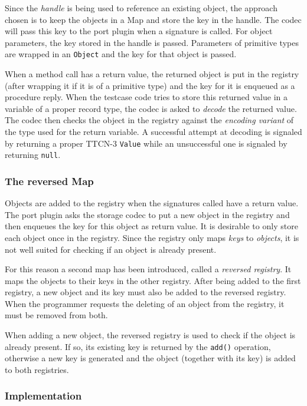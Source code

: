 Since the \emph{handle} is being used to reference an existing object,
the approach chosen is to keep the objects in a Map
and store the key in the handle.
The codec will pass this key to the port plugin when a signature is called.
For object parameters, the key stored in the handle is passed.
Parameters of primitive types are wrapped in an \verb=Object=
and the key for that object is passed.

When a method call has a return value,
the returned object is put in the registry
(after wrapping it if it is of a primitive type)
and the key for it is enqueued as a procedure reply.
When the testcase code tries to store this returned value
in a variable of a proper record type,
the codec is asked to \emph{decode} the returned value.
The codec then checks the object in the registry
against the \emph{encoding variant} of the type used for the return variable.
A successful attempt at decoding is signaled by returning
a proper \ac{TTCN-3} \verb=Value=
while an unsuccessful one is signaled by returning \verb=null=.


\subsubsection{The reversed Map}

Objects are added to the registry
when the signatures called have a return value.
The port plugin asks the storage codec to put a new object in the registry
and then enqueues the key for this object as return value.
It is desirable to only store each object once in the registry.
Since the registry only maps \emph{keys} to \emph{objects},
it is not well suited for checking if an object is already present.

For this reason a second map has been introduced,
called a \emph{reversed registry}.
It maps the objects to their keys in the other registry.
After being added to the first registry,
a new object and its key must also be added to the reversed registry.
When the programmer requests the deleting of an object from the registry,
it must be removed from both.

When adding a new object, the reversed registry is used
to check if the object is already present.
If so, its existing key is returned by the \verb=add()= operation,
otherwise a new key is generated and the object (together with its key)
is added to both registries.


\subsubsection{Implementation}

